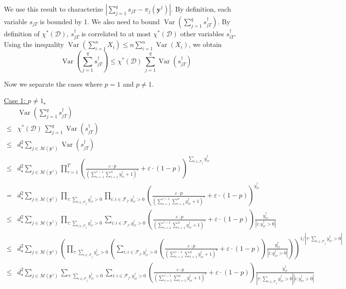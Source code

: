 \documentclass[nonblindrev]{informs3noheader}
\DeclareMathOperator{\Var}{Var}
\def\calD{\mathcal{D}}
\def\calF{\mathcal{F}}
\def\calM{\mathcal{M}}
\def\by{\boldsymbol{y}}
\begin{document}
We use this result to characterize $\left|\sum_{j=1}^q s_{jT} - \pi_{j}(\by^\dagger)\right|$. By definition, each variable $s_{jT}$ is bounded by 1. We also need to bound $\Var\left(\sum_{j=1}^q s^\dagger_{jT}\right)$. By definition of $\chi^*(\calD)$, $s^\dagger_{jT}$ is correlated to at most $\chi^*(\calD)$ other variables $s^\dagger_{iT}$. Using the inequality $\Var(\sum_{i=1}^n X_i)\leq n \sum_{i=1}^n \Var(X_i)$, we obtain
\[\Var\left(\sum_{j=1}^q s^\dagger_{jT}\right) \leq  \chi^*(\calD)\ \sum_{j=1}^q \Var(s^\dagger_{jT})\]

Now we separate the cases where $p=1$ and $p\neq 1$.

\underline{Case 1: $p\neq 1$.}
\begin{align*}
	&\Var\left(\sum_{j=1}^q s^\dagger_{jT}\right)
	\\\leq & \chi^*(\calD)\ \sum_{j=1}^q \Var(s^\dagger_{jT})
	\\\leq & d_\star^2 \sum_{j \in \calM(\by^\dagger)} \Var(s^\dagger_{jT})
	\\\leq & d_\star^2\sum_{j \in \calM(\by^\dagger)}  \prod_{\tau=1}^T \left(\frac{\varepsilon\cdot p}{\left(\sum_{s=1}^{\tau-1} \sum_{i=1}^n y^\dagger_{is} + 1\right)^r}+\varepsilon\cdot(1-p)\right)^{\sum_{i \in \calF_j} y^\dagger_{i\tau}}
	\\= & d_\star^2\sum_{j \in \calM(\by^\dagger)}  \prod_{\tau:\sum_{i \in \calF_j} y^\dagger_{i\tau}>0 }  \prod_{i:i \in \calF_j, y^\dagger_{i\tau}>0 }  \left(\frac{\varepsilon\cdot p}{\left(\sum_{s=1}^{\tau-1} \sum_{i=1}^n y^\dagger_{is} + 1\right)^r}+\varepsilon\cdot(1-p)\right)^{ y^\dagger_{i\tau}}    
	\\\leq & d_\star^2\sum_{j \in \calM(\by^\dagger)}  \prod_{\tau:\sum_{i \in \calF_j} y^\dagger_{i\tau}>0 } \sum_{i: i \in \calF_j,  y^\dagger_{i\tau}>0} \left(\frac{\varepsilon\cdot p}{\left(\sum_{s=1}^{\tau-1} \sum_{i=1}^n y^\dagger_{is} + 1\right)^r}+\varepsilon\cdot(1-p)\right)\frac{y^\dagger_{i\tau}}{|i:  y^\dagger_{i\tau}>0|}
	\\\leq & d_\star^2\sum_{j \in \calM(\by^\dagger)}  \left(\prod_{\tau:\sum_{i \in \calF_j} y^\dagger_{i\tau}>0 } \left(\sum_{i: i \in \calF_j,  y^\dagger_{i\tau}>0} \left(\frac{\varepsilon\cdot p}{\left(\sum_{s=1}^{\tau-1} \sum_{i=1}^n y^\dagger_{is} + 1\right)^r}+\varepsilon\cdot(1-p)\right)\frac{y^\dagger_{i\tau}}{|i:  y^\dagger_{i\tau}>0|}\right)\right)^{1/|\tau:\sum_{i \in \calF_j} y^\dagger_{i\tau}>0 |}
	\\\leq & d_\star^2\sum_{j \in \calM(\by^\dagger)}  \sum_{\tau:\sum_{i \in \calF_j} y^\dagger_{i\tau}>0 }\sum_{i: i \in \calF_j,  y^\dagger_{i\tau}>0}\left(\frac{\varepsilon\cdot p}{\left(\sum_{s=1}^{\tau-1} \sum_{i=1}^n y^\dagger_{is} + 1\right)^r}+\varepsilon\cdot(1-p)\right)\frac{y^\dagger_{i\tau}}{|\tau:\sum_{i \in \calF_j} y^\dagger_{i\tau}>0 ||i:  y^\dagger_{i\tau}>0|}    

\end{align*}
\end{document}
